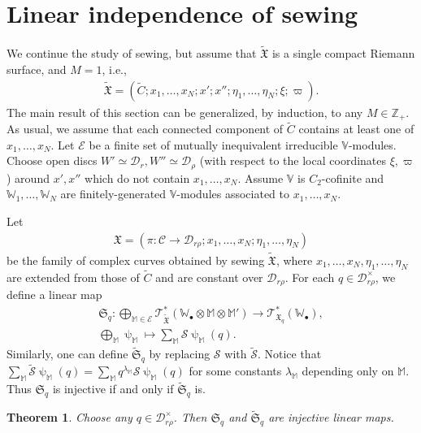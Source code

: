 \documentclass[12pt,a4paper,notitlepage]{report}
\theoremstyle{definition}
\theoremstyle{plain}
\newtheorem{thm}[df]{Theorem}
\newcommand{\fk}{\mathfrak}
\newcommand{\mc}{\mathcal}
\newcommand{\wtd}{\widetilde}
\newcommand{\scr}{\mathscr}
\newcommand{\blt}{\bullet}
\newcommand{\Vbb}{\mathbb V}
\newcommand{\Wbb}{\mathbb W}
\newcommand{\Mbb}{\mathbb M}
\newcommand{\Zbb}{\mathbb Z}
\numberwithin{equation}{section}
\begin{document}
\section{Linear independence of sewing}\label{lb104}

We continue the study of sewing, but assume that $\wtd{\fk X}$ is a single compact Riemann surface, and $M=1$, i.e.,
\begin{align*}
\wtd{\fk X}=(\wtd C;x_1,\dots,x_N;x';x'';\eta_1,\dots,\eta_N;\xi;\varpi).
\end{align*}
The main result of this section can be generalized, by induction, to any $M\in\Zbb_+$. As usual, we assume that each connected component of $\wtd C$ contains at least one of $x_1,\dots,x_N$. Let $\mc E$ be a finite set of mutually inequivalent irreducible $\Vbb$-modules. Choose open discs $W'\simeq \mc D_r,W''\simeq\mc D_\rho$ (with respect to the local coordinates $\xi,\varpi$) around $x',x''$ which do not contain $x_1,\dots,x_N$. Assume $\Vbb$ is $C_2$-cofinite and $\Wbb_1,\dots,\Wbb_N$ are finitely-generated $\Vbb$-modules associated to $x_1,\dots,x_N$. 

Let
\begin{align*}
\fk X=(\pi:\mc C\rightarrow\mc D_{r\rho};x_1,\dots,x_N;\eta_1,\dots,\eta_N)
\end{align*}
be the family of complex curves obtained by sewing $\wtd{\fk X}$, where $x_1,\dots,x_N,\eta_1,\dots,\eta_N$ are extended from those of $\wtd C$ and are constant over $\mc D_{r\rho}$. For each $q\in\mc D_{r\rho}^\times$, we define a linear map
\begin{gather}
\fk S_q:\bigoplus_{\Mbb\in\mc E}\scr T_{\wtd{\fk X}}^*(\Wbb_\blt\otimes\Mbb\otimes\Mbb')\rightarrow\scr T_{\fk X_q}^*(\Wbb_\blt),\label{eq191}\\
\bigoplus_\Mbb\uppsi_\Mbb\mapsto \sum_\Mbb\mc S\uppsi_\Mbb(q).\nonumber
\end{gather}
Similarly, one can define $\wtd{\fk S}_q$ by replacing $\mc S$ with $\wtd{\mc S}$. Notice that $\sum_\Mbb\wtd{\mc S}\uppsi_\Mbb(q)=\sum_\Mbb q^{\lambda_\Mbb}\mc S\uppsi_\Mbb(q)$ for some constants $\lambda_\Mbb$ depending only on $\Mbb$. Thus $\fk S_q$ is injective if and only if $\wtd{\fk S}_q$ is.


\begin{thm}\label{lb114}
Choose any $q\in\mc D_{r\rho}^\times$. Then $\fk S_q$ and $\wtd{\fk S}_q$ are injective linear maps.
\end{thm}
\end{document}
